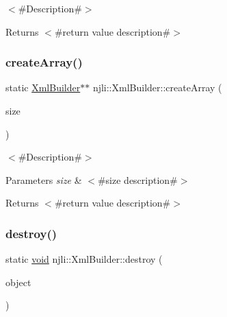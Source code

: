 $<$\#\+Description\#$>$

\begin{DoxyReturn}{Returns}
$<$\#return value description\#$>$ 
\end{DoxyReturn}
\mbox{\label{classnjli_1_1_xml_builder_aed042470b666dc03e23109134351b06b}} 
\subsubsection{\texorpdfstring{create\+Array()}{createArray()}}
{\footnotesize\ttfamily static \mbox{\hyperlink{classnjli_1_1_xml_builder}{Xml\+Builder}}$\ast$$\ast$ njli\+::\+Xml\+Builder\+::create\+Array (\begin{DoxyParamCaption}\item[{const \mbox{\hyperlink{_util_8h_a10e94b422ef0c20dcdec20d31a1f5049}{u32}}}]{size }\end{DoxyParamCaption})\hspace{0.3cm}{\ttfamily [static]}}

$<$\#\+Description\#$>$


\begin{DoxyParams}{Parameters}
{\em size} & $<$\#size description\#$>$\\
\hline
\end{DoxyParams}
\begin{DoxyReturn}{Returns}
$<$\#return value description\#$>$ 
\end{DoxyReturn}
\mbox{\label{classnjli_1_1_xml_builder_a93f26e2678915d16446b560854d104ce}} 
\subsubsection{\texorpdfstring{destroy()}{destroy()}}
{\footnotesize\ttfamily static \mbox{\hyperlink{_thread_8h_af1e856da2e658414cb2456cb6f7ebc66}{void}} njli\+::\+Xml\+Builder\+::destroy (\begin{DoxyParamCaption}\item[{\mbox{\hyperlink{classnjli_1_1_xml_builder}{Xml\+Builder}} $\ast$}]{object }\end{DoxyParamCaption})\hspace{0.3cm}{\ttfamily [static]}}

